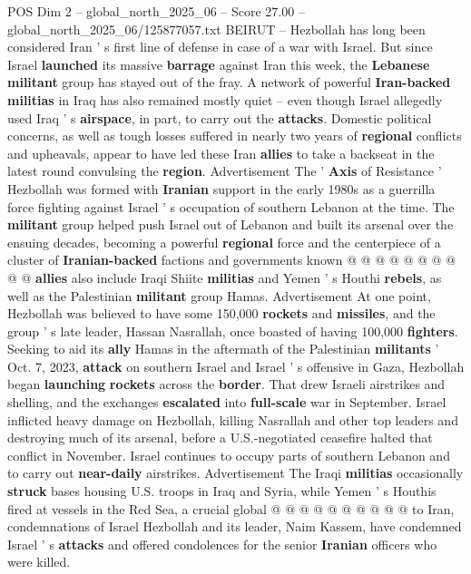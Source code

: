 \begin{textsample}{POS Dim 2 – global\_north\_2025\_06 – Score 27.00 – global\_north\_2025\_06/125877057.txt}  \label{ex:f2_pos_351}
BEIRUT -- Hezbollah has long been considered Iran ' s first line of defense in case of a war with Israel.
But since Israel \textbf{launched} its massive \textbf{barrage} against Iran this week, the \textbf{Lebanese} \textbf{militant} group has stayed out of the fray.
A network of powerful \textbf{Iran-backed} \textbf{militias} in Iraq has also remained mostly quiet -- even though Israel allegedly used Iraq ' s \textbf{airspace}, in part, to carry out the \textbf{attacks}.
Domestic political concerns, as well as tough losses suffered in nearly two years of \textbf{regional} conflicts and upheavals, appear to have led these Iran \textbf{allies} to take a backseat in the latest round convulsing the \textbf{region}.
Advertisement The ' \textbf{Axis} of Resistance ' Hezbollah was formed with \textbf{Iranian} support in the early 1980s as a guerrilla force fighting against Israel ' s occupation of southern Lebanon at the time.
The \textbf{militant} group helped push Israel out of Lebanon and built its arsenal over the ensuing decades, becoming a powerful \textbf{regional} force and the centerpiece of a cluster of \textbf{Iranian-backed} factions and governments known @ @ @ @ @ @ @ @ @ @ \textbf{allies} also include Iraqi Shiite \textbf{militias} and Yemen ' s Houthi \textbf{rebels}, as well as the Palestinian \textbf{militant} group Hamas.
Advertisement At one point, Hezbollah was believed to have some 150,000 \textbf{rockets} and \textbf{missiles}, and the group ' s late leader, Hassan Nasrallah, once boasted of having 100,000 \textbf{fighters}.
Seeking to aid its \textbf{ally} Hamas in the aftermath of the Palestinian \textbf{militants} ' Oct. 7, 2023, \textbf{attack} on southern Israel and Israel ' s offensive in Gaza, Hezbollah began \textbf{launching} \textbf{rockets} across the \textbf{border}.
That drew Israeli airstrikes and shelling, and the exchanges \textbf{escalated} into \textbf{full-scale} war in September.
Israel inflicted heavy damage on Hezbollah, killing Nasrallah and other top leaders and destroying much of its arsenal, before a U.S.-negotiated ceasefire halted that conflict in November.
Israel continues to occupy parts of southern Lebanon and to carry out \textbf{near-daily} airstrikes.
Advertisement The Iraqi \textbf{militias} occasionally \textbf{struck} bases housing U.S. troops in Iraq and Syria, while Yemen ' s Houthis fired at vessels in the Red Sea, a crucial global @ @ @ @ @ @ @ @ @ @ to Iran, condemnations of Israel Hezbollah and its leader, Naim Kassem, have condemned Israel ' s \textbf{attacks} and offered condolences for the senior \textbf{Iranian} officers who were killed.

\end{textsample}

